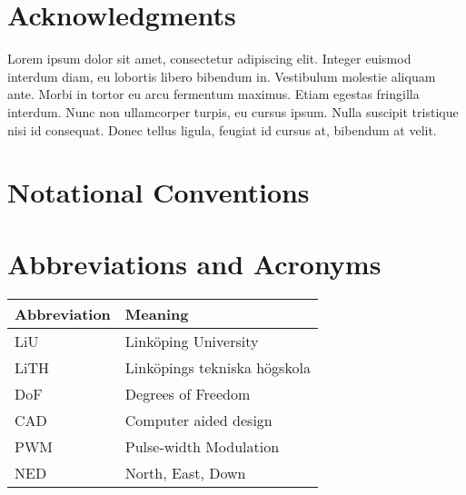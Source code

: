 \documentclass[11pt,a4paper,twoside]{article}
\begin{document}
\clearpage
\thispagestyle{empty}
\cleardoublepage
\thispagestyle{plain}


\section*{Acknowledgments}

Lorem ipsum dolor sit amet, consectetur adipiscing elit. Integer euismod interdum diam, eu lobortis libero bibendum in. Vestibulum molestie aliquam ante. Morbi in tortor eu arcu fermentum maximus. Etiam egestas fringilla interdum. Nunc non ullamcorper turpis, eu cursus ipsum. Nulla suscipit tristique nisi id consequat. Donec tellus ligula, feugiat id cursus at, bibendum at velit.

\clearpage
\thispagestyle{empty}
\cleardoublepage
\thispagestyle{plain}


\section*{Notational Conventions}
\label{cha:notation}
\vspace{-2ex}


\section*{Abbreviations and Acronyms}
\vspace*{-2ex}
\begin{longtable}{p{}p{}} %

 \multicolumn{1}{l}{\bfseries Abbreviation} &
 \multicolumn{1}{l}{\bfseries Meaning}\\

\endhead
\endfoot

LiU     & Linköping University\\
LiTH	  & Linköpings tekniska högskola \\
DoF		  & Degrees of Freedom \\
CAD     & Computer aided design\\
PWM     & Pulse-width Modulation\\
NED     & North, East, Down\\

\end{longtable}
\vspace*{1ex}
\end{document}
